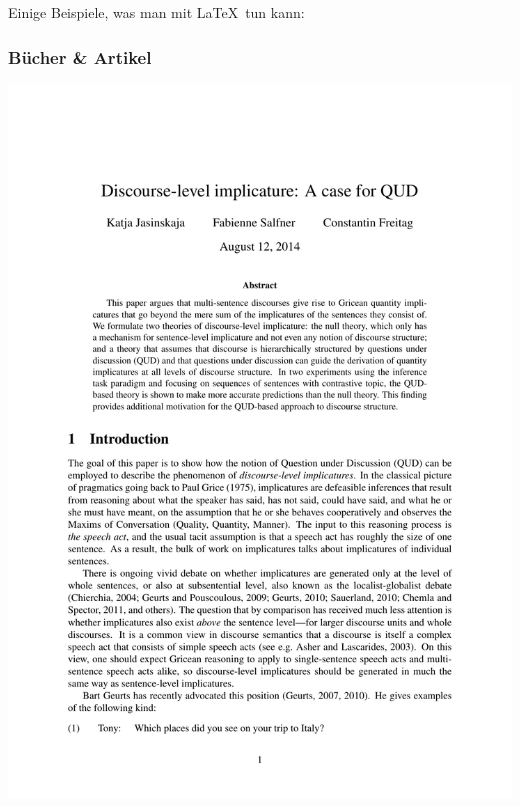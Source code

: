 \begin{frame}

Einige Beispiele, was man mit \LaTeX\ tun kann:

\end{frame}


\begin{frame}
\frametitle{Bücher \& Artikel}


\begin{minipage}[c]{0.49\textwidth}
\centering
\includegraphics[width=0.80\linewidth]{../../texfiles-beamer/tex-material/WissArb-latex/LaTeX_article.pdf}
\end{minipage}  
%  
\begin{minipage}[c]{0.49\textwidth}
\centering

\end{minipage}
\end{frame}
